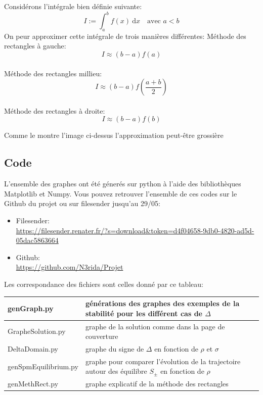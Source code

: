 \documentclass{article}
\newtheorem[M , nocut]{prop}{Proposition}[section]
\newtheorem[M , nocut]{definition}{Définition}
\newtheorem[M , nocut]{lemme}{Lemme}
\newtheorem[L , nocut]{thm}{Théoreme}
\newtheorem[M , nocut]{cor}{Corollaire}
\begin{document}
Considérons l'intégrale bien définie suivante:
\[
  I := \int_a^b f(x)\ \mathrm{d}x\quad \text{avec }a<b
\] 
On peur approximer cette intégrale de trois manières différentes:
Méthode des rectangles à gauche:
\[
    I \approx (b-a) f(a)
\]\\
Méthode des rectangles millieu:
\[
    I \approx (b-a) f(\frac{a+b}{2})
\]\\
Méthode des rectangles à droite:
\[
    I \approx (b-a) f(b)
\]
\begin{example}[Remarque]
    Comme le montre l'image ci-dessus l'approximation peut-être grossière
\end{example}

\subsection*{Code}
L'ensemble des graphes ont été génerés sur python à l'aide des bibliothèques Matplotlib et Numpy. Vous pouvez retrouver l'ensemble de ces codes sur le Github du projet ou sur filesender jusqu'au 29/05:
\begin{itemize}
    \item Filesender:\\ \url{https://filesender.renater.fr/?s=download&token=d4f04658-9db0-4820-ad5d-05dac5863664}
    \item Github:\\ \url{https://github.com/N3rida/Projet}
\end{itemize}
Les correspondance des fichiers sont celles donné par ce tableau:\\
\begin{tabular}{|m{}|m{}|}
    \hline
    genGraph.py & générations des graphes des exemples de la stabilité pour les différent cas de $\Delta$\\
    \hline
    GrapheSolution.py & graphe de la solution comme dans la page de couverture\\
    \hline
    DeltaDomain.py & graphe du signe de $\Delta$ en fonction de $\rho$ et $\sigma$\\
    \hline
    genSpmEquilibrium.py & graphe pour comparer l'évolution de la trajectoire autour des équilibre $S_\pm$ en fonction de $\rho$\\
    \hline
    genMethRect.py & graphe explicatif de la méthode des rectangles\\
    \hline
\end{tabular}

\newpage
\nocite{*}
\printbibliography[heading=bibintoc,title={Bibliographie}]
\end{document}
